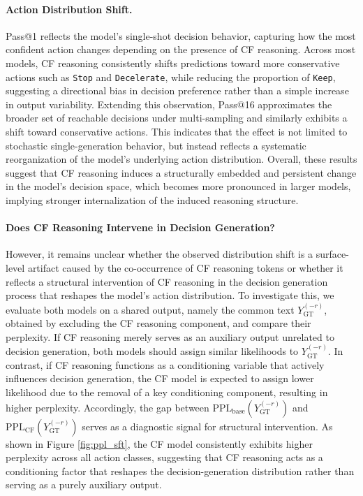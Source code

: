 \documentclass{article}
\begin{document}
\paragraph{Action Distribution Shift.} Pass@1 reflects the model’s single-shot decision behavior, capturing how the most confident action changes depending on the presence of CF reasoning. Across most models, CF reasoning consistently shifts predictions toward more conservative actions such as \texttt{Stop} and \texttt{Decelerate}, while reducing the proportion of \texttt{Keep}, suggesting a directional bias in decision preference rather than a simple increase in output variability. Extending this observation, Pass@16 approximates the broader set of reachable decisions under multi-sampling and similarly exhibits a shift toward conservative actions. This indicates that the effect is not limited to stochastic single-generation behavior, but instead reflects a systematic reorganization of the model’s underlying action distribution. Overall, these results suggest that CF reasoning induces a structurally embedded and persistent change in the model’s decision space, which becomes more pronounced in larger models, implying stronger internalization of the induced reasoning structure.

\paragraph{Does CF Reasoning Intervene in Decision Generation?} 

However, it remains unclear whether the observed distribution shift is a surface-level artifact caused by the co-occurrence of CF reasoning tokens or whether it reflects a structural intervention of CF reasoning in the decision generation process that reshapes the model’s action distribution. To investigate this, we evaluate both models on a shared output, namely the common text $Y^{(-r)}_{\text{GT}}$, obtained by excluding the CF reasoning component, and compare their perplexity. If CF reasoning merely serves as an auxiliary output unrelated to decision generation, both models should assign similar likelihoods to $Y^{(-r)}_{\text{GT}}$. In contrast, if CF reasoning functions as a conditioning variable that actively influences decision generation, the CF model is expected to assign lower likelihood due to the removal of a key conditioning component, resulting in higher perplexity. Accordingly, the gap between $\text{PPL}_{\text{base}}(Y^{(-r)}_{\text{GT}})$ and $\text{PPL}_{\text{CF}}(Y^{(-r)}_{\text{GT}})$ serves as a diagnostic signal for structural intervention. As shown in Figure \ref{fig:ppl_sft}, the CF model consistently exhibits higher perplexity across all action classes, suggesting that CF reasoning acts as a conditioning factor that reshapes the decision-generation distribution rather than serving as a purely auxiliary output.
\end{document}
